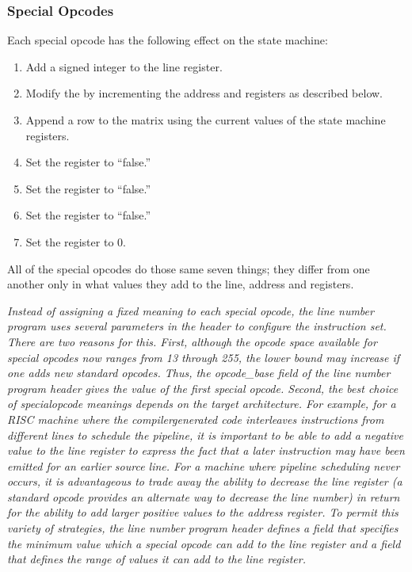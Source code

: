 \subsubsection{Special Opcodes} 
\label{chap:specialopcodes}
Each  special opcode has the following effect on the state machine:

\begin{enumerate}[1. ]

\item  Add a signed integer to the line register.

\item  Modify the  by incrementing the
address and  registers as described below.

\item  Append a row to the matrix using the current values
of the state machine registers.

\item  Set the  register to ``false.'' 
\item  Set the  register to ``false.''
\item  Set the  register to ``false.''
\item  Set the  register to 0.

\end{enumerate}

All of the special opcodes do those same seven things; they
differ from one another only in what values they add to the
line, address and  registers.


\textit{Instead of assigning a fixed meaning to each special opcode,
the line number program uses several parameters in the header
to configure the instruction set. There are two reasons
for this.  First, although the opcode space available for
special opcodes now ranges from 13 through 255, the lower
bound may increase if one adds new standard opcodes. Thus, the
opcode\_base field of the line number program header gives the
value of the first special opcode. Second, the best choice of
special\dash opcode meanings depends on the target architecture. For
example, for a RISC machine where the compiler\dash generated code
interleaves instructions from different lines to schedule
the pipeline, it is important to be able to add a negative
value to the line register to express the fact that a later
instruction may have been emitted for an earlier source
line. For a machine where pipeline scheduling never occurs,
it is advantageous to trade away the ability to decrease
the line register (a standard opcode provides an alternate
way to decrease the line number) in return for the ability
to add larger positive values to the address register. To
permit this variety of strategies, the line number program
header defines a 
field that specifies the minimum
value which a special opcode can add to the line register
and a 
field that defines the range of values it
can add to the line register.}


